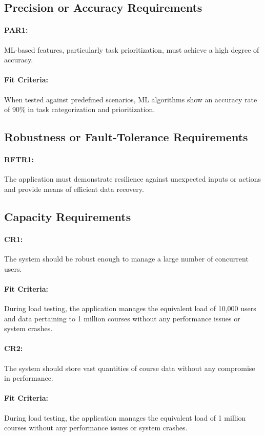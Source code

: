 \documentclass[12pt]{article}
\begin{document}
\subsection{Precision or Accuracy Requirements}
\paragraph{PAR1:} ML-based features, particularly task prioritization, must achieve a high degree of accuracy.
\paragraph{Fit Criteria:} When tested against predefined scenarios, ML algorithms show an accuracy rate of 90\% in task categorization and prioritization.

\subsection{Robustness or Fault-Tolerance Requirements}
\paragraph{RFTR1:} The application must demonstrate resilience against unexpected inputs or actions and provide means of efficient data recovery.


\subsection{Capacity Requirements}
\paragraph{CR1:} The system should be robust enough to manage a large number of concurrent users.
\paragraph{Fit Criteria:} During load testing, the application manages the equivalent load of 10,000 users and data pertaining to 1 million courses without any performance issues or system crashes.
\paragraph{CR2:}The system should store vast quantities of course data without any compromise in performance.
\paragraph{Fit Criteria:} During load testing, the application manages the equivalent load of 1 million courses without any performance issues or system crashes.
\end{document}
